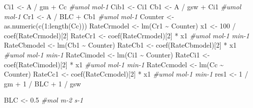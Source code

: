 \documentclass[
]{krantz}
\makeatletter
\newenvironment{Shaded}{\begin{snugshade}}{\end{snugshade}}
\newcommand{\CommentTok}[1]{\textcolor[rgb]{0.56,0.35,0.01}{\textit{#1}}}
\newcommand{\DecValTok}[1]{\textcolor[rgb]{0.00,0.00,0.81}{#1}}
\newcommand{\FloatTok}[1]{\textcolor[rgb]{0.00,0.00,0.81}{#1}}
\newcommand{\FunctionTok}[1]{\textcolor[rgb]{0.00,0.00,0.00}{#1}}
\newcommand{\NormalTok}[1]{#1}
\newcommand{\OtherTok}[1]{\textcolor[rgb]{0.56,0.35,0.01}{#1}}
\newcommand{\SpecialCharTok}[1]{\textcolor[rgb]{0.00,0.00,0.00}{#1}}
\newenvironment{kframe}{%
\medskip{}
\setlength{\fboxsep}{.8em}
 \def\at@end@of@kframe{}%
 \ifinner\ifhmode%
  \def\at@end@of@kframe{\end{minipage}}%
  \begin{minipage}{\columnwidth}%
 \fi\fi%
 \def\FrameCommand##1{\hskip\@totalleftmargin \hskip-\fboxsep
 \colorbox{shadecolor}{##1}\hskip-\fboxsep
     \hskip-\linewidth \hskip-\@totalleftmargin \hskip\columnwidth}%
 \MakeFramed {\advance\hsize-\width
   \@totalleftmargin\z@ \linewidth\hsize
   \@setminipage}}%
 {\par\unskip\endMakeFramed%
 \at@end@of@kframe}
\renewenvironment{Shaded}{\begin{kframe}}{\end{kframe}}
\makeatother
\begin{document}
\begin{Shaded}
\begin{Highlighting}[]
\NormalTok{Ci1 }\OtherTok{\textless{}{-}}\NormalTok{ A }\SpecialCharTok{/}\NormalTok{ gm }\SpecialCharTok{+}\NormalTok{ Cc }\CommentTok{\#umol mol{-}1}
\NormalTok{Cib1 }\OtherTok{\textless{}{-}}\NormalTok{ Ci1}
\NormalTok{Cb1 }\OtherTok{\textless{}{-}}\NormalTok{ A }\SpecialCharTok{/}\NormalTok{ gsw }\SpecialCharTok{+}\NormalTok{ Ci1 }\CommentTok{\#umol mol{-}1}
\NormalTok{Cr1 }\OtherTok{\textless{}{-}}\NormalTok{ A }\SpecialCharTok{/}\NormalTok{ BLC }\SpecialCharTok{+}\NormalTok{ Cb1 }\CommentTok{\#umol mol{-}1}
\NormalTok{Counter }\OtherTok{\textless{}{-}} \FunctionTok{as.numeric}\NormalTok{(}\FunctionTok{c}\NormalTok{(}\DecValTok{1}\SpecialCharTok{:}\FunctionTok{length}\NormalTok{(Cc)))}
\NormalTok{RateCrmodel }\OtherTok{\textless{}{-}} \FunctionTok{lm}\NormalTok{(Cr1 }\SpecialCharTok{\textasciitilde{}}\NormalTok{ Counter)}
\NormalTok{x1 }\OtherTok{\textless{}{-}} \DecValTok{100} \SpecialCharTok{/} \FunctionTok{coef}\NormalTok{(RateCrmodel)[}\DecValTok{2}\NormalTok{]}
\NormalTok{RateCr1 }\OtherTok{\textless{}{-}} \FunctionTok{coef}\NormalTok{(RateCrmodel)[}\DecValTok{2}\NormalTok{] }\SpecialCharTok{*}\NormalTok{ x1 }\CommentTok{\#umol mol{-}1 min{-}1}
\NormalTok{RateCbmodel }\OtherTok{\textless{}{-}} \FunctionTok{lm}\NormalTok{(Cb1 }\SpecialCharTok{\textasciitilde{}}\NormalTok{ Counter)}
\NormalTok{RateCb1 }\OtherTok{\textless{}{-}} \FunctionTok{coef}\NormalTok{(RateCbmodel)[}\DecValTok{2}\NormalTok{] }\SpecialCharTok{*}\NormalTok{ x1 }\CommentTok{\#umol mol{-}1 min{-}1}
\NormalTok{RateCimodel }\OtherTok{\textless{}{-}} \FunctionTok{lm}\NormalTok{(Ci1 }\SpecialCharTok{\textasciitilde{}}\NormalTok{ Counter)}
\NormalTok{RateCi1 }\OtherTok{\textless{}{-}} \FunctionTok{coef}\NormalTok{(RateCimodel)[}\DecValTok{2}\NormalTok{] }\SpecialCharTok{*}\NormalTok{ x1 }\CommentTok{\#umol mol{-}1 min{-}1}
\NormalTok{RateCcmodel }\OtherTok{\textless{}{-}} \FunctionTok{lm}\NormalTok{(Cc }\SpecialCharTok{\textasciitilde{}}\NormalTok{ Counter)}
\NormalTok{RateCc1 }\OtherTok{\textless{}{-}} \FunctionTok{coef}\NormalTok{(RateCcmodel)[}\DecValTok{2}\NormalTok{] }\SpecialCharTok{*}\NormalTok{ x1 }\CommentTok{\#umol mol{-}1 min{-}1}
\NormalTok{res1 }\OtherTok{\textless{}{-}} \DecValTok{1} \SpecialCharTok{/}\NormalTok{ gm }\SpecialCharTok{+} \DecValTok{1} \SpecialCharTok{/}\NormalTok{ BLC }\SpecialCharTok{+} \DecValTok{1} \SpecialCharTok{/}\NormalTok{ gsw}

\NormalTok{BLC }\OtherTok{\textless{}{-}} \FloatTok{0.5} \CommentTok{\#mol m{-}2 s{-}1}


\end{Highlighting}
\end{Shaded}
\end{document}

